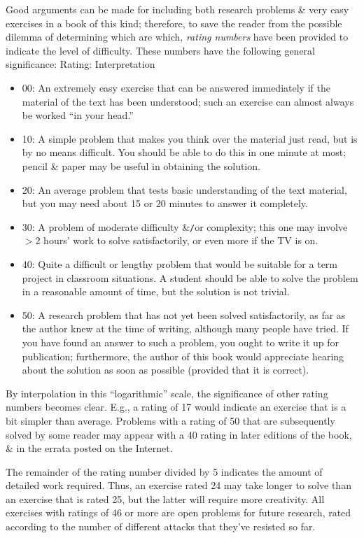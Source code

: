 \documentclass{article}
\begin{document}
Good arguments can be made for including both research problems \& very easy exercises in a book of this kind; therefore, to save the reader from the possible dilemma of determining which are which, {\it rating numbers} have been provided to indicate the level of difficulty. These numbers have the following general significance: {\sf Rating: Interpretation}
\begin{itemize}
	\item 00: An extremely easy exercise that can be answered immediately if the material of the text has been understood; such an exercise can almost always be worked ``in your head.''
	\item 10: A simple problem that makes you think over the material just read, but is by no means difficult. You should be able to do this in one minute at most; pencil \& paper may be useful in obtaining the solution.
	\item 20: An average problem that tests basic understanding of the text material, but you may need about 15 or 20 minutes to answer it completely.
	\item 30: A problem of moderate difficulty \&{\tt/}or complexity; this one may involve $> 2$ hours' work to solve satisfactorily, or even more if the TV is on.
	\item 40: Quite a difficult or lengthy problem that would be suitable for a term project in classroom situations. A student should be able to solve the problem in a reasonable amount of time, but the solution is not trivial.
	\item 50: A research problem that has not yet been solved satisfactorily, as far as the author knew at the time of writing, although many people have tried. If you have found an answer to such a problem, you ought to write it up for publication; furthermore, the author of this book would appreciate hearing about the solution as soon as possible (provided that it is correct).
\end{itemize}
By interpolation in this ``logarithmic'' scale, the significance of other rating numbers becomes clear. E.g., a rating of 17 would indicate an exercise that is a bit simpler than average. Problems with a rating of 50 that are subsequently solved by some reader may appear with a 40 rating in later editions of the book, \& in the errata posted on the Internet.

The remainder of the rating number divided by 5 indicates the amount of detailed work required. Thus, an exercise rated 24 may take longer to solve than an exercise that is rated 25, but the latter will require more creativity. All exercises with ratings of 46 or more are open problems for future research, rated according to the number of different attacks that they've resisted so far.
\end{document}
